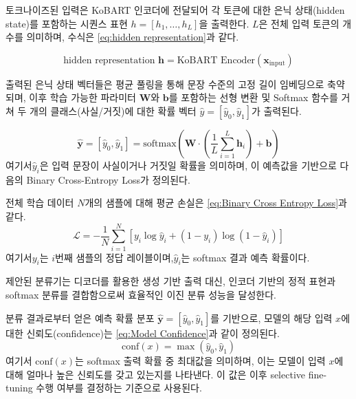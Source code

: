 \documentclass[a4paper,fleqn]{cas-sc}
\begin{document}
토크나이즈된 입력은 KoBART 인코더에 전달되어 각 토큰에 대한 은닉 상태(hidden state)를 포함하는 시퀀스 표현 \(h = [h_{1}, \ldots, h_{L}]\)을 출력한다. 
\( L \)은 전체 입력 토큰의 개수를 의미하며, 수식은 \cref{eq:hidden representation}과 같다.

\begin{equation}
    \text{hidden representation } \mathbf{h}  = \text{KoBART Encoder}(\mathbf{x}_{\text{input}}) 
    \label{eq:hidden representation}
\end{equation}

출력된 은닉 상태 벡터들은 평균 풀링을 통해 문장 수준의 고정 길이 임베딩으로 축약되며, 이후 학습 가능한 파라미터  \(\mathbf{W}\)와 \(\mathbf{b}\)를 포함하는 선형 변환 및 Softmax 함수를 거쳐 두 개의 클래스(사실/거짓)에 대한 확률 벡터 \(\hat{y} = [\hat{y}_{0}, \hat{y}_{1}]\)가 출력된다.

\begin{equation}
    \hat{\mathbf{y}} = [\hat{y}_{0}, \hat{y}_{1}] 
    = \mathrm{softmax}\left( \mathbf{W} \cdot \left( \frac{1}{L} \sum_{i=1}^{L} \mathbf{h}_i \right) + \mathbf{b} \right)
\end{equation}
\noindent
여기서 ​\(\hat{y}_i\)은 입력 문장이 사실이거나 거짓일 확률을 의미하며, 이 예측값을 기반으로 다음의 Binary Cross-Entropy Loss가 정의된다. 

전체 학습 데이터 \(N\)개의 샘플에 대해 평균 손실은 \cref{eq:Binary Cross Entropy Loss}과 같다.
\begin{equation}
    \mathcal{L} = -\frac{1}{N} \sum_{i=1}^{N} \left[ y_i \log \hat{y}_i + (1 - y_i) \log (1 - \hat{y}_i) \right]
    \label{eq:Binary Cross Entropy Loss}
\end{equation}
\noindent
여기서 ​\({y}_i\)는 \(i\)번째 샘플의 정답 레이블이며, ​\(\hat{y}_i\)는 softmax 결과 예측 확률이다. 

제안된 분류기는 디코더를 활용한 생성 기반 출력 대신, 인코더 기반의 정적 표현과 softmax 분류를 결합함으로써 효율적인 이진 분류 성능을 달성한다. 

분류 결과로부터 얻은 예측 확률 분포 \(\hat{\mathbf{y}} = [\hat{y}_{0}, \hat{y}_{1}]\)를 기반으로, 모델의 해당 입력 \(x\)에 대한 신뢰도(confidence)는 \cref{eq:Model Confidence}과 같이 정의된다.
\begin{equation}
    \mathrm{conf}(x) = \max \left( \hat{y}_0, \hat{y}_1 \right)
    \label{eq:Model Confidence}
\end{equation}
\noindent
여기서 \( \mathrm{conf}(x) \)는 softmax 출력 확률 중 최대값을 의미하며, 이는 모델이 입력 \( x \)에 대해 얼마나 높은 신뢰도를 갖고 있는지를 나타낸다. 
이 값은 이후 selective fine-tuning 수행 여부를 결정하는 기준으로 사용된다.
\end{document}
